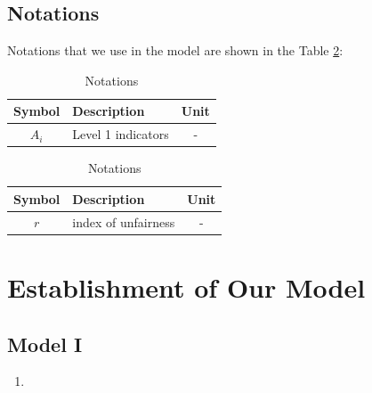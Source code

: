 \documentclass[12pt]{article}  %
\begin{document}
\subsection{Notations}
Notations that we use in the model are shown in the Table \ref{tb:notation}:
\begin{table}[!htbp]
\begin{center}
\caption{Notations}
\begin{tabular}{clc}
	\toprule
	\multicolumn{1}{m{3cm}}{\centering Symbol}
	&\multicolumn{1}{m{8cm}}{Description}& Unit\\
	\midrule
	$A_i$&Level 1 indicators&- \\
	\bottomrule
\end{tabular}\label{tb:notation}
\end{center}
\end{table}
\begin{table}[htbp]
	\centering
	\caption{Notations}
	\begin{tabular}[cp{0.9\textwidth}]{clc}
		\toprule[2pt]
		\setlength{\leftskip}{0pt plus 1fil minus \marginparwidth}
		\setlength{\rightskip}{\leftskip}
		Symbol & Description&Unit\\
		\midrule
		$r$ & index of unfairness&- \\
		\bottomrule[2pt]
	\end{tabular}\label{tb:notation}
\end{table}












\section{Establishment of Our Model}
\subsection{Model I}

\begin{enumerate}
    \renewcommand{\labelenumi}{\textbf{Step \theenumi}}
    \item 

\end{enumerate}
\end{document}
